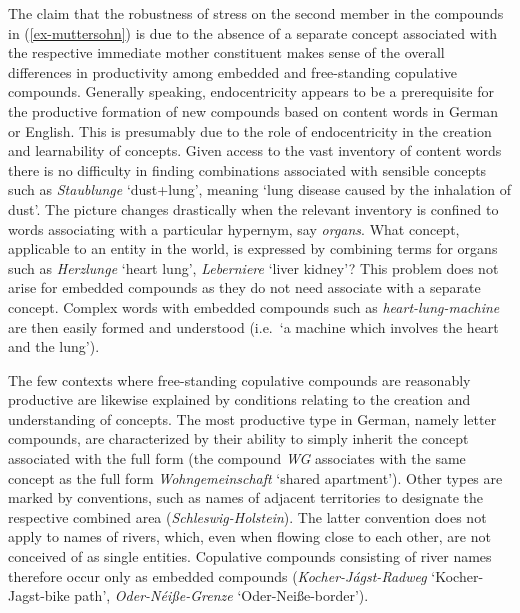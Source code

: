 \documentclass[output=paper
 ,nobabel
 ,draftmode
 ,colorlinks, citecolor=brown
]{langscibook}
\begin{document}
The claim that the robustness of stress on the second member in the compounds in
(\ref{ex-muttersohn}) is due to the absence of a separate concept associated with the respective
immediate mother constituent makes sense of the overall differences in productivity among embedded
and free-standing copulative compounds. Generally speaking, endocentricity appears to be a
prerequisite for the productive formation of new compounds based on content words in German or
English. This is presumably due to the role of endocentricity in the creation and learnability of
concepts. Given access to the vast inventory of content words there is no difficulty in finding
combinations associated with sensible concepts such as \emph{Staublunge} `dust+lung', meaning `lung
disease caused by the inhalation of dust'. The picture changes drastically when the relevant
inventory is confined to words associating with a particular hypernym, say \emph{organs}. What
concept, applicable to an entity in the world, is expressed by combining terms for organs such as
\emph{Herzlunge} `heart lung', \emph{Leberniere } `liver kidney'? This problem does not arise for
embedded compounds as they do not need associate with a separate concept. Complex words with
embedded compounds such as \emph{heart-lung-machine} are then easily formed and understood (i.e.\ `a
machine which involves the heart and the lung'). 

The few contexts where free-standing copulative compounds are reasonably productive are likewise
explained by conditions relating to the creation and understanding of concepts. The most productive
type in German, namely letter compounds, are characterized by their ability to simply inherit the
concept associated with the full form (\eg the compound \emph{WG} associates with the same concept
as the full form \emph{Wohngemeinschaft} `shared apartment'). Other types are marked by conventions,
such as names of adjacent territories to designate the respective combined area
(\emph{Schleswig-Holstein}). The latter convention does not apply to names of rivers, which, even
when flowing close to each other, are not conceived of as single entities. Copulative compounds
consisting of river names therefore occur only as embedded compounds (\eg \emph{Kocher-Jágst-Radweg}
`Kocher-Jagst-bike path', \emph{Oder-Néiße-Grenze} `Oder-Neiße-border').
\end{document}
